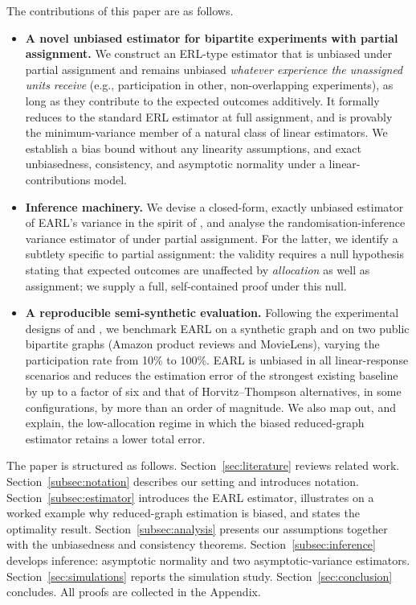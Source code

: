 \documentclass[sigconf]{acmart}
\newcounter{assumption}
\begin{document}
The contributions of this paper are as follows.
\begin{itemize}
    \item \textbf{A novel unbiased estimator for bipartite experiments with partial assignment.} We construct an ERL-type estimator that is unbiased under partial assignment and remains unbiased \emph{whatever experience the unassigned units receive} (e.g., participation in other, non-overlapping experiments), as long as they contribute to the expected outcomes additively. It formally reduces to the standard ERL estimator at full assignment, and is provably the minimum-variance member of a natural class of linear estimators. We establish a bias bound without any linearity assumptions, and exact unbiasedness, consistency, and asymptotic normality under a linear-contributions model.
    \item \textbf{Inference machinery.} We devise a closed-form, exactly unbiased estimator of EARL's variance in the spirit of \citet{harshaw2023erl}, and analyse the randomisation-inference variance estimator of \citet{shi2025scalableanalysisbipartiteexperiments} under partial assignment. For the latter, we identify a subtlety specific to partial assignment: the validity requires a null hypothesis stating that expected outcomes are unaffected by \emph{allocation} as well as assignment; we supply a full, self-contained proof under this null.
    \item \textbf{A reproducible semi-synthetic evaluation.} Following the experimental designs of \citet{doudchenko2020causal} and \citet{harshaw2023erl}, we benchmark EARL on a synthetic graph and on two public bipartite graphs (Amazon product reviews and MovieLens), varying the participation rate from 10\% to 100\%. EARL is unbiased in all linear-response scenarios and reduces the estimation error of the strongest existing baseline by up to a factor of six and that of Horvitz--Thompson alternatives, in some configurations, by more than an order of magnitude. We also map out, and explain, the low-allocation regime in which the biased reduced-graph estimator retains a lower total error.
\end{itemize}

The paper is structured as follows. Section~\ref{sec:literature} reviews related work. Section~\ref{subsec:notation} describes our setting and introduces notation. Section~\ref{subsec:estimator} introduces the EARL estimator, illustrates on a worked example why reduced-graph estimation is biased, and states the optimality result. Section~\ref{subsec:analysis} presents our assumptions together with the unbiasedness and consistency theorems. Section~\ref{subsec:inference} develops inference: asymptotic normality and two asymptotic-variance estimators. Section~\ref{sec:simulations} reports the simulation study. Section~\ref{sec:conclusion} concludes. All proofs are collected in the Appendix.
\end{document}
